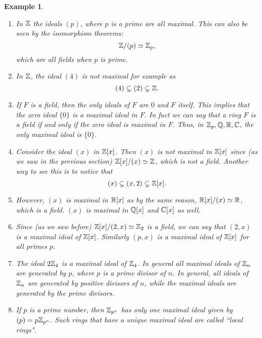 \documentclass[12pt]{article}
\theoremstyle{plain}
\newtheorem{example}{Example}
\theoremstyle{definition}
\theoremstyle{remark}
\begin{document}
\begin{example}
\begin{enumerate}
    \item In $\mathbb{Z}$ the ideals $(p)$, where $p$ is a prime are all maximal. This can also be seen by the isomorphism theorems: 
    $$\mathbb{Z}/(p)\simeq \mathbb{Z}_p,$$
    which are all fields when $p$ is prime. 
    \item In $\mathbb{Z}$, the ideal $(4)$ is not maximal for example as 
    $$(4) \subsetneq (2) \subsetneq \mathbb{Z}.$$
    \item If $F$ is a field, then the only ideals of $F$ are $0$ and $F$ itself. This implies that the zero ideal $\{0\}$ is a maximal ideal in $F$. In fact we can say that a ring $F$ is a field if and only if the zero ideal is maximal in $F$. Thus, in $\mathbb{Z}_p, \mathbb{Q}, \mathbb{R}, \mathbb{C}$, the only maximal ideal is $\{0\}$. 
    \item Consider the ideal $(x)$ in $\mathbb{Z}[x]$. Then $(x)$ is not maximal in $\mathbb{Z}[x]$ since (as we saw in the previous section) $\mathbb{Z}[x]/(x)\simeq \mathbb{Z}$, which is not a field. Another way to see this is to notice that 
    $$(x) \subsetneq (x,2) \subsetneq \mathbb{Z}[x].$$
    \item However, $(x)$ is maximal in $\mathbb{R}[x]$ as by the same reason, $\mathbb{R}[x]/(x)\simeq \mathbb{R}$, which is a field. $(x)$ is maximal in $\mathbb{Q}[x]$ and $\mathbb{C}[x]$ as well.  
    \item Since (as we saw before) $\mathbb{Z}[x]/(2,x) \simeq \mathbb{Z}_2$ is a field, we can say that $(2,x)$ is a maximal ideal of $\mathbb{Z}[x]$. Similarly $(p,x)$ is a maximal ideal of $\mathbb{Z}[x]$ for all primes $p$. 
    \item The ideal $2\mathbb{Z}_4$ is a maximal ideal of $\mathbb{Z}_4$. In general all maximal ideals of $\mathbb{Z}_n$ are generated by $p$, where $p$ is a prime divisor of $n$. In general, all ideals of $\mathbb{Z}_n$ are generated by positive divisors of $n$, while the maximal ideals are generated by the prime divisors. 
    \item If $p$ is a prime number, then $\mathbb{Z}_{p^n}$ has only one maximal ideal given by $(p) = p\mathbb{Z}_{p^n}$. Such rings that have a unique maximal ideal are called ``local rings". 
\end{enumerate}
\end{example}
\end{document}
